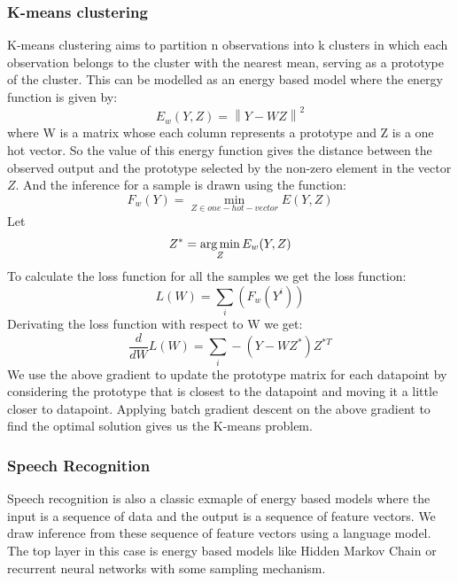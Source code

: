 \subsubsection{K-means clustering}
K-means clustering aims to partition n observations into k clusters in which each observation belongs to the cluster with the nearest mean, serving as a prototype of the cluster. This can be modelled as an energy based model where the energy function is given by:
\begin{equation}
    E_{w}(Y,Z) = \left\|Y - WZ \right \|^{2}
\end{equation}
where W is a matrix whose each column represents a prototype and Z is a one hot vector. So the value of this energy function gives the distance between the observed output and the prototype selected by the non-zero element in the vector $Z$.
And the inference for a sample is drawn using the function:
\begin{equation}
    F_{w}(Y) = \min_{Z \in one-hot-vector} E(Y, Z)
\end{equation}
Let 
\begin{equation}
    Z^{*} = \argmin_{Z} E_{w}(Y, Z)
\end{equation}
To calculate the loss function for all the samples we get the loss function:
\begin{equation}
    L(W) = \sum_{i}(F_{w}(Y^{i}))
\end{equation}
Derivating the loss function with respect to W we get:
\begin{equation}
    \frac{d}{dW} L(W) = \sum_{i}-(Y - WZ^{*}) Z^{*T}
\end{equation}
We use the above gradient to update the prototype matrix for each datapoint by considering the prototype that is closest to the datapoint and moving it a little closer to datapoint. Applying batch gradient descent on the above gradient to find the optimal solution gives us the K-means problem.

\subsubsection{Speech Recognition}
Speech recognition is also a classic exmaple of energy based models where the input is a sequence of data and the output is a sequence of feature vectors. We draw inference from these sequence of feature vectors using a language model. The top layer in this case is energy based models like Hidden Markov Chain or recurrent neural networks with some sampling mechanism.

